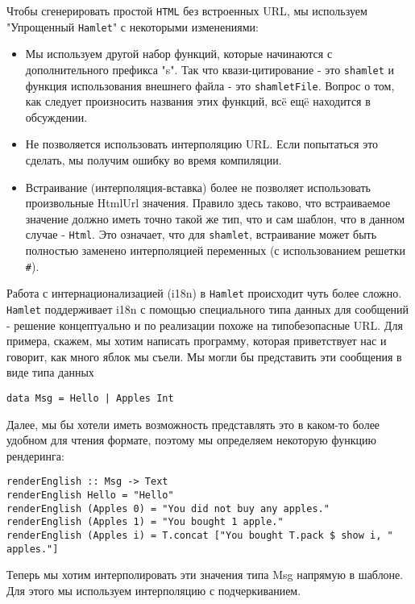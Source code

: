 Чтобы сгенерировать простой \texttt{HTML} без встроенных URL, мы используем
"Упрощенный \texttt{Hamlet}" с некоторыми изменениями:

\begin{itemize}
    \item Мы используем другой набор функций, которые начинаются с
        дополнительного префикса "s". Так что квази-цитирование - это
        \texttt{shamlet} и функция использования внешнего файла - это
        \texttt{shamletFile}. Вопрос о том, как следует произносить названия
        этих функций, всë ещë находится в обсуждении.
    \item Не позволяется использовать интерполяцию URL. Если попытаться это
        сделать, мы получим ошибку во время компиляции.
    \item Встраивание (интерполяция-вставка) более не позволяет использовать
        произвольные HtmlUrl значения. Правило здесь таково, что встраиваемое
        значение должно иметь точно такой же тип, что и сам шаблон, что в
        данном случае - \lstinline!Html!. Это означает, что для
        \texttt{shamlet}, встраивание может быть полностью заменено
        интерполяцией переменных (с использованием решетки \texttt{\#}).
\end{itemize}

Работа с интернационализацией (i18n) в \texttt{Hamlet} происходит чуть более
сложно.  \texttt{Hamlet} поддерживает i18n с помощью специального типа данных
для сообщений - решение концептуально и по реализации похоже на типобезопасные
URL. Для примера, скажем, мы хотим написать программу, которая приветствует нас
и говорит, как много яблок мы съели. Мы могли бы представить эти сообщения в
виде типа данных

\begin{lstlisting}
data Msg = Hello | Apples Int
\end{lstlisting}

Далее, мы бы хотели иметь возможность представлять это в каком-то более удобном
для чтения формате, поэтому мы определяем некоторую функцию рендеринга:
\begin{lstlisting}
renderEnglish :: Msg -> Text
renderEnglish Hello = "Hello"
renderEnglish (Apples 0) = "You did not buy any apples."
renderEnglish (Apples 1) = "You bought 1 apple."
renderEnglish (Apples i) = T.concat ["You bought T.pack $ show i, " apples."]
\end{lstlisting}

Теперь мы хотим интерполировать эти значения типа Msg напрямую в шаблоне.  Для
этого мы используем интерполяцию с подчеркиванием.

